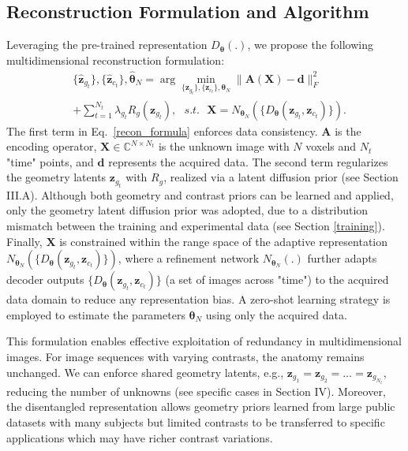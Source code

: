 \documentclass[journal,twoside,web]{ieeecolor}
\begin{document}
\subsection{Reconstruction Formulation and Algorithm}
Leveraging the pre-trained representation $D_{\boldsymbol{\theta}}(.)$, we propose the following multidimensional reconstruction formulation:
\begin{equation}
\begin{split}
&\{\hat{\mathbf{z}}_{g_t}\},\{\hat{\mathbf{z}}_{c_t}\},\hat{\boldsymbol{\theta}}_N = 
\arg \underset{\{\mathbf{z}_{g_t}\},\{\mathbf{z}_{c_t}\},\boldsymbol{\theta}_N}{\operatorname{min}}
\|\mathbf{A}(\mathbf{X})-\mathbf{d}\|_F^2   \\&+\sum_{t=1}^{N_t}{\lambda}_{g_t}R_{g}(\mathbf{z}_{g_t}), 
\text{ } s.t.\text{ } \mathbf{X} = N_{\boldsymbol{\theta}_N}(\{D_{\boldsymbol{\theta}}(\mathbf{z}_{g_t},\mathbf{z}_{c_t})\}). \label{recon_formula}
\end{split}
\end{equation}
The first term in Eq.~\eqref{recon_formula} enforces data consistency. $\mathbf{A}$ is the encoding operator, $\mathbf{X} \in \mathbb{C}^{N \times N_t}$ is the unknown image with $N$ voxels and $N_t$ "time" points, and $\mathbf{d}$ represents the acquired data. The second term regularizes the geometry latents $\mathbf{z}_{g_t}$ with $R_g$, realized via a latent diffusion prior (see Section III.A). Although both geometry and contrast priors can be learned and applied, only the geometry latent diffusion prior was adopted, due to a distribution mismatch between the training and experimental data (see Section \ref{training}).
Finally, $\mathbf{X}$ is constrained within the range space of the adaptive representation 
$N_{\boldsymbol{\theta}_N}(\{D_{\boldsymbol{\theta}}(\mathbf{z}_{g_t},\mathbf{z}_{c_t})\})$, where a refinement network $N_{\boldsymbol{\theta}_N}(.)$ further adapts decoder outputs $\{D_{\boldsymbol{\theta}}(\mathbf{z}_{g_t},\mathbf{z}_{c_t})\}$ (a set of images across "time") to the acquired data domain to reduce any representation bias. A zero-shot learning strategy is employed to estimate the parameters $\boldsymbol{\theta}_N$ using only the acquired data. 

This formulation enables effective exploitation of redundancy in multidimensional images. For image sequences with varying contrasts, the anatomy remains unchanged. We can enforce shared geometry latents, e.g., $\mathbf{z}_{g_1}=\mathbf{z}_{g_2}=\dots=\mathbf{z}_{g_{N_t}}$, reducing the number of unknowns (see specific cases in Section IV). Moreover, the disentangled representation allows geometry priors learned from large public datasets with many subjects but limited contrasts to be transferred to specific applications which may have richer contrast variations.
\end{document}
